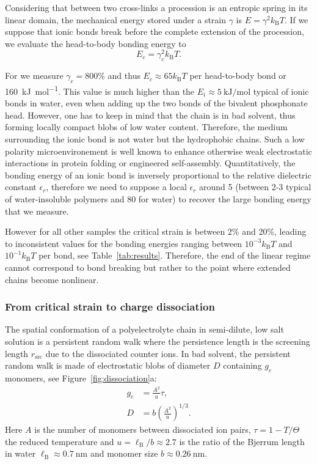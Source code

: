 \documentclass[journal=jacsat,manuscript=article]{achemso}
\begin{document}
Considering that between two cross-links a procession is an entropic spring in its linear domain, the mechanical energy stored under a strain $\gamma$ is $E = \gamma^2 k_\mathrm{B}T$. If we suppose that ionic bonds break before the complete extension of the procession, we evaluate the head-to-body bonding energy to
\begin{equation}
E_c = \gamma_c^2 k_\mathrm{B}T.
\label{eq:Ec}
\end{equation}

For  we measure $\gamma_c = 800\%$ and thus $E_c \approx 65 k_\mathrm{B}T$ per head-to-body bond or \SI{160}{\kilo\joule\per\mol}. This value is much higher than the $E_i\approx\SI{5}{\kilo\joule\per\mol}$ typical of ionic bonds in water\cite{Schneider1992}, even when adding up the two bonds of the bivalent phosphonate head. However, one has to keep in mind that the chain is in bad solvent, thus forming locally compact blobs of low water content. Therefore, the medium surrounding the ionic bond is not water but the hydrophobic chains. Such a low polarity microenvironement is well known to enhance otherwise weak electrostatic interactions in protein folding or engineered self-assembly\cite{Rehm2010}. Quantitatively, the bonding energy of an ionic bond is inversely proportional to the relative dielectric constant $\epsilon_r$, therefore we need to suppose a local $\epsilon_r$ around 5 (between 2-3 typical of water-insoluble polymers and 80 for water) to recover the large bonding energy that we measure.

However for all other samples the critical strain is between 2\% and 20\%, leading to inconsistent values for the bonding energies ranging between $10^{-3}k_\mathrm{B}T$ and $10^{-1}k_\mathrm{B}T$ per bond, see Table~\ref{tab:results}. Therefore, the end of the linear regime cannot correspond to bond breaking but rather to the point where extended chains become nonlinear.


\subsubsection{From critical strain to charge dissociation}

The spatial conformation of a polyelectrolyte chain in semi-dilute, low salt solution is a persistent random walk where the persistence length is the screening length $r_\mathrm{src}$ due to the dissociated counter ions\cite{Rubinstein1996}. In bad solvent, the persistent random walk is made of electrostatic blobs of diameter $D$ containing $g_e$ monomers, see Figure~\ref{fig:dissociation}a:
\begin{align}
g_e &= \frac{A^2}{u}\tau\label{eq:ge},\\
D &= b \left(\frac{A^2}{u}\right)^{1/3}\label{eq:D}.
\end{align}
Here $A$ is the number of monomers between dissociated ion pairs, $\tau = 1 - T/\Theta$ the reduced temperature and $u = \ell_\mathrm{B}/b \approx 2.7$ is the ratio of the Bjerrum length in water $\ell_\mathrm{B}\approx \SI{0.7}{\nano\metre}$ and monomer size $b\approx \SI{0.26}{\nano\metre}$. 
\end{document}
